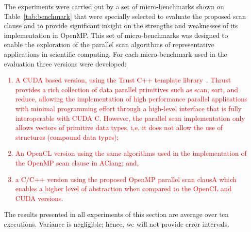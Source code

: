 \documentclass[Ingles]{ic-tese-v1}
\newcommand{\ed}[1]{\noindent\textcolor{red}{ {#1}}}
\newcommand{\ed}[1]{}
\begin{document}
The experiments were carried out by a set of micro-benchmarks
shown on  Table~\ref{tab:benchmark} that were specially selected to  evaluate
the  proposed scan clause  and to  provide significant
insight on the strengths and weaknesses of its  implementation in OpenMP.
This set of  micro-benchmarks was designed to  enable the exploration
of  the  parallel scan  algorithms  of  representative applications  in
scientific computing.  For each micro-benchmark  used  in   the  evaluation
three  versions  were developed:
\ed{
\begin{enumerate}
	\item A CUDA based version, using the Trust C++ template library~\cite{trust}.
	Thrust provides a  rich collection of data  parallel primitives such
	as scan,  sort, and reduce,  allowing the implementation of  high performance
	parallel  applications with  minimal  programming  effort through  a
	high-level  interface   that  is   fully  interoperable   with  CUDA
	C. However, the parallel scan  implementation only allows vectors of
	primitive  data  types, i,e.   it  does  not  allow the  use  of
	structures (compound data types);
	\item An  OpenCL version using the same algorithms used in the
	implementation of the OpenMP scan clause in AClang; and,
	\item a C/C++ version using the proposed OpenMP parallel scan clausA
	which enables a  higher level of abstraction when compared to the OpenCL and
	CUDA versions.
\end{enumerate}}

The results presented  in all experiments of this  section are average
over  ten  executions. Variance  is  negligible;  hence, we  will  not
provide error intervals.
\end{document}
